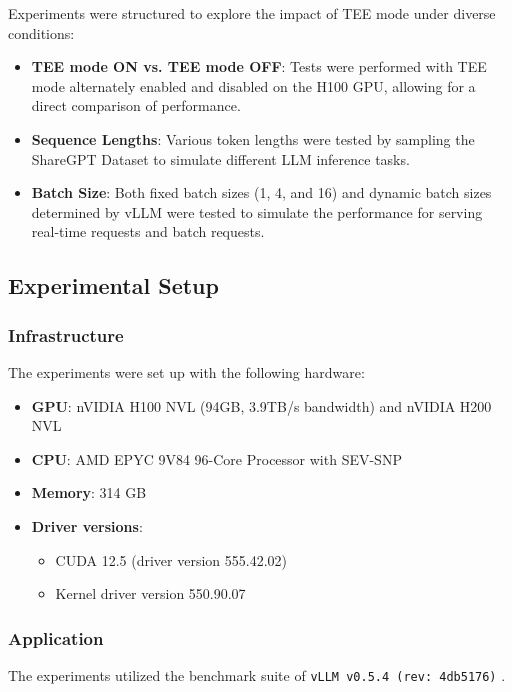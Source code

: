 \documentclass{article}
\begin{document}
Experiments were structured to explore the impact of TEE mode under diverse conditions:
\begin{itemize}
    \item \textbf{TEE mode ON vs. TEE mode OFF}: Tests were performed with TEE mode alternately enabled and disabled on the H100 GPU, allowing for a direct comparison of performance.
    \item \textbf{Sequence Lengths}: Various token lengths were tested by sampling the ShareGPT Dataset \cite{sharegpt} to simulate different LLM inference tasks.
    \item \textbf{Batch Size}: Both fixed batch sizes (1, 4, and 16) and dynamic batch sizes determined by vLLM \cite{kwon2023efficient} were tested to simulate the performance for serving real-time requests and batch requests.
\end{itemize}

\subsection{Experimental Setup}

\subsubsection{Infrastructure}

The experiments were set up with the following hardware:

\begin{itemize}
    \item \textbf{GPU}: nVIDIA H100 NVL (94GB, 3.9TB/s bandwidth) and nVIDIA H200 NVL
    \item \textbf{CPU}: AMD EPYC 9V84 96-Core Processor with SEV-SNP
    \item \textbf{Memory}: 314 GB
    \item \textbf{Driver versions}:
          \begin{itemize}
              \item CUDA 12.5 (driver version 555.42.02)
              \item Kernel driver version 550.90.07
          \end{itemize}
\end{itemize}

\subsubsection{Application}

The experiments utilized the benchmark suite of \texttt{vLLM v0.5.4 (rev: 4db5176)} \cite{kwon2023efficient}.
\end{document}
